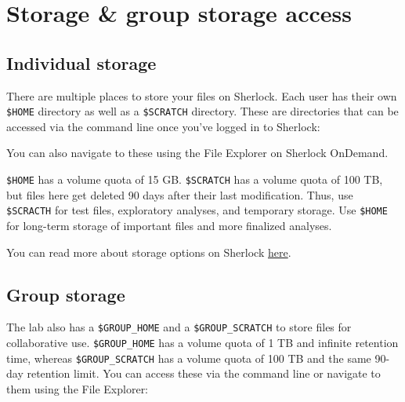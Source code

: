 \documentclass[
]{book}
\newenvironment{Shaded}{\begin{snugshade}}{\end{snugshade}}
\newcommand{\BuiltInTok}[1]{#1}
\newcommand{\CommentTok}[1]{\textcolor[rgb]{0.56,0.35,0.01}{\textit{#1}}}
\newcommand{\NormalTok}[1]{#1}
\newcommand{\VariableTok}[1]{\textcolor[rgb]{0.00,0.00,0.00}{#1}}
\begin{document}
\section{Storage \& group storage access}\label{storage-group-storage-access}

\subsection{Individual storage}\label{individual-storage}

There are multiple places to store your files on Sherlock. Each user has their own \texttt{\$HOME} directory as well as a \texttt{\$SCRATCH} directory. These are directories that can be accessed via the command line once you've logged in to Sherlock:

\begin{Shaded}
\end{Shaded}

You can also navigate to these using the File Explorer on Sherlock OnDemand.

\texttt{\$HOME} has a volume quota of 15 GB. \texttt{\$SCRATCH} has a volume quota of 100 TB, but files here get deleted 90 days after their last modification. Thus, use \texttt{\$SCRACTH} for test files, exploratory analyses, and temporary storage. Use \texttt{\$HOME} for long-term storage of important files and more finalized analyses.

You can read more about storage options on Sherlock \href{https://www.sherlock.stanford.edu/docs/storage/}{here}.

\subsection{Group storage}\label{group-storage}

The lab also has a \texttt{\$GROUP\_HOME} and a \texttt{\$GROUP\_SCRATCH} to store files for collaborative use. \texttt{\$GROUP\_HOME} has a volume quota of 1 TB and infinite retention time, whereas \texttt{\$GROUP\_SCRATCH} has a volume quota of 100 TB and the same 90-day retention limit. You can access these via the command line or navigate to them using the File Explorer:
\end{document}
